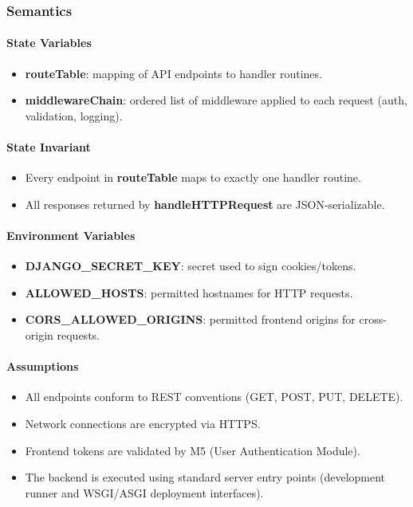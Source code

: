 \documentclass[12pt, titlepage]{article}
\begin{document}
  \subsubsection{Semantics}

  \paragraph{State Variables}
  \begin{itemize}
    \item \textbf{routeTable}: mapping of API endpoints to handler routines.
    \item \textbf{middlewareChain}: ordered list of middleware applied to each request (auth, validation, logging).
  \end{itemize}

  \paragraph{State Invariant}
  \begin{itemize}
    \item Every endpoint in \textbf{routeTable} maps to exactly one handler routine.
    \item All responses returned by \textbf{handleHTTPRequest} are JSON-serializable.
  \end{itemize}


  \paragraph{Environment Variables}
  \begin{itemize}
    \item \textbf{DJANGO\_SECRET\_KEY}: secret used to sign cookies/tokens.
    \item \textbf{ALLOWED\_HOSTS}: permitted hostnames for HTTP requests.
    \item \textbf{CORS\_ALLOWED\_ORIGINS}: permitted frontend origins for cross-origin requests.
  \end{itemize}


\paragraph{Assumptions}
\begin{itemize}
  \item All endpoints conform to REST conventions (GET, POST, PUT, DELETE).
  \item Network connections are encrypted via HTTPS.
  \item Frontend tokens are validated by M5 (User Authentication Module).
  \item The backend is executed using standard server entry points (development runner and WSGI/ASGI deployment interfaces).
\end{itemize}
\end{document}
